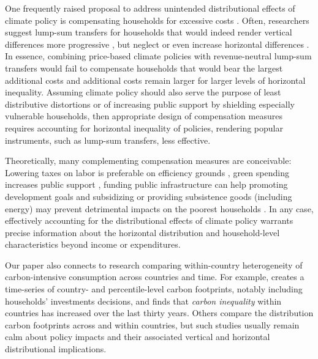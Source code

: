 \documentclass[12pt, a4paper]{article}
\begin{document}
One frequently raised proposal to address unintended distributional effects of climate policy is compensating households for excessive costs \autocite{Klenert.2018,Baranzini.2017}. Often, researchers suggest lump-sum transfers for households that would indeed render vertical differences more progressive \autocite{Budolfson.2021,Steckel.2021b,vanderPloeg.2022}, but neglect or even increase horizontal differences \autocite{Cronin.2019,Hansel.2022}. In essence, combining price-based climate policies with revenue-neutral lump-sum transfers would fail to compensate households that would bear the largest additional costs and additional costs remain larger for larger levels of horizontal inequality. Assuming climate policy should also serve the purpose of least distributive distortions \autocite{Fischer.2019} or of increasing public support by shielding especially vulnerable households, then appropriate design of compensation measures requires accounting for horizontal inequality of policies, rendering popular instruments, such as lump-sum transfers, less effective. 

Theoretically, many complementing compensation measures are conceivable: Lowering taxes on labor is preferable on efficiency grounds \autocite{Goulder.1995,Bento.2018}, green spending increases public support \autocite{Sommer.2022}, funding public infrastructure can help promoting development goals \autocite{Franks.2018} and subsidizing or providing subsistence goods (including energy) may prevent detrimental impacts on the poorest households \autocite{Greve.2022}. In any case, effectively accounting for the distributional effects of climate policy warrants precise information about the horizontal distribution and household-level characteristics beyond income or expenditures. 

Our paper also connects to research comparing within-country heterogeneity of carbon-intensive consumption across countries and time. For example, \textcite{Chancel.2022} creates a time-series of country- and percentile-level carbon footprints, notably including households' investments decisions, and finds that \textit{carbon inequality} within countries has increased over the last thirty years. Others \autocite{Oswald.2020,Bruckner.2022} compare the distribution carbon footprints across and within countries, but such studies usually remain calm about policy impacts and their associated vertical and horizontal distributional implications.
\end{document}
